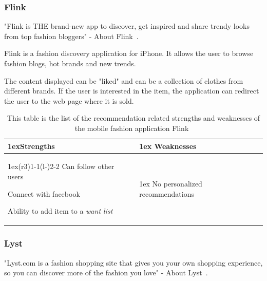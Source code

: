 \subsubsection{Flink} %
\label{par:flink}
    "Flink is THE brand-new app to discover, get inspired and share trendy looks from top fashion bloggers" - About Flink~\cite{flink}.

    Flink is a fashion discovery application for iPhone.
    It allows the user to browse fashion blogs, hot brands and new trends.

    The content displayed can be "liked" and can be a collection of clothes from different brands.
    If the user is interested in the item, the application can redirect the user to the web page where it is sold.
    \begin{table}[H]
            \centering
            \begin{tabularx}{\linewidth}{>{\parskip1ex}X@{\kern4\tabcolsep}>{\parskip1ex}X}
                \toprule
                \hfil\bfseries Strengths
                &
                \hfil\bfseries Weaknesses
                \\\cmidrule(r{3\tabcolsep}){1-1}\cmidrule(l{-\tabcolsep}){2-2}
                Can follow other users \par
                Connect with facebook \par
                Ability to add item to a \emph{want list} \par
                &
                No personalized recommendations \par
                \\\bottomrule 
                \end{tabularx}
        \caption[Recommendation related strengths and weaknesses of Flink~\cite{flink}]{This table is the list of the recommendation related strengths and weaknesses of the mobile fashion application Flink~\cite{flink}}
        \label{table:iphoneAppFlink}
    \end{table}

\subsubsection{Lyst} %
\label{par:lyst}
    "Lyst.com is a fashion shopping site that gives you your own shopping experience, so you can discover more of the fashion you love" - About Lyst~\cite{lyst}.

